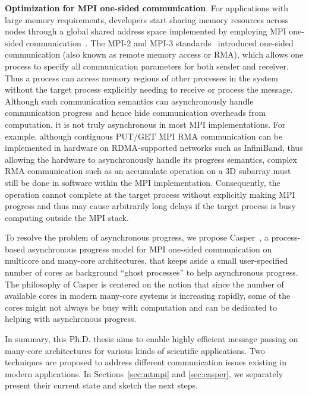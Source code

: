 \vspace{0.2ex}
\noindent\textbf{Optimization for MPI one-sided communication}.  For
applications with large memory requirements, developers start sharing
memory resources across nodes through a global shared address space
implemented by employing MPI one-sided
communication~\cite{dinan12:armci_mpi}.  The MPI-2 and MPI-3
standards~\cite{mpi30-report} introduced one-sided communication (also
known as remote memory access or RMA), which allows one process to
specify all communication parameters for both sender and receiver.
Thus a process can access memory regions of other processes in the
system without the target process explicitly needing to receive or
process the message. Although such communication semantics can
asynchronously handle communication progress and hence hide
communication overheads from computation, it is not truly asynchronous
in most MPI implementations. For example, although contiguous PUT/GET
MPI RMA communication can be implemented in hardware on RDMA-supported
networks such as InfiniBand, thus allowing the hardware to
asynchronously handle its progress semantics, complex RMA
communication such as an accumulate operation on a 3D subarray must
still be done in software within the MPI implementation.
Consequently, the operation cannot complete at the target process
without explicitly making MPI progress and thus may cause arbitrarily
long delays if the target process is busy computing outside the MPI
stack.

To resolve the problem of asynchronous progress, we propose
Casper~\cite{casper}, a process-based asynchronous progress model for
MPI one-sided communication on multicore and many-core architectures,
that keeps aside a small user-specified number of cores as background
``ghost processes'' to help asynchronous progress. The philosophy of
Casper is centered on the notion that since the number of available
cores in modern many-core systems is increasing rapidly, some of the
cores might not always be busy with computation and can be dedicated
to helping with asynchronous progress.

In summary, this Ph.D. thesis aims to enable highly efficient message
passing on many-core architectures for various kinds of scientific
applications. Two techniques are proposed to address different
communication issues existing in modern applications.  In
Sections~\ref{sec:mtmpi} and \ref{sec:casper}, we separately present
their current state and sketch the next steps.

